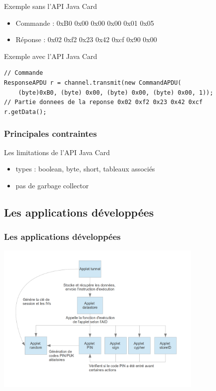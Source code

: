 \documentclass{beamer}
\begin{document}
\begin{frame}[fragile]
    \begin{exampleblock}{Exemple sans l'API Java Card}
        \begin{itemize}
            \item Commande : 0xB0 0x00 0x00 0x00 0x01 0x05
            \item Réponse : 0x02 0xf2 0x23 0x42 0xcf 0x90 0x00
        \end{itemize}
    \end{exampleblock}
    \begin{exampleblock}{Exemple avec l'API Java Card}
        \begin{lstlisting}
// Commande
ResponseAPDU r = channel.transmit(new CommandAPDU(
    (byte)0xB0, (byte) 0x00, (byte) 0x00, (byte) 0x00, 1));
// Partie donnees de la reponse 0x02 0xf2 0x23 0x42 0xcf
r.getData(); 
        \end{lstlisting}
    \end{exampleblock}
\end{frame}

\begin{frame}
    \frametitle{Principales contraintes}
    \begin{block}{Les limitations de l'API Java Card}
        \begin{itemize}
            \item types : boolean, byte, short, tableaux associés
            \item pas de \og garbage collector \fg{}
        \end{itemize}
    \end{block}
\end{frame}

\subsection{Les applications développées}
\begin{frame}
    \frametitle{Les applications développées}
    \includegraphics[width=10cm]{graphe_dep}
    \begin{block}{}
    \end{block}
\end{frame}
\end{document}
